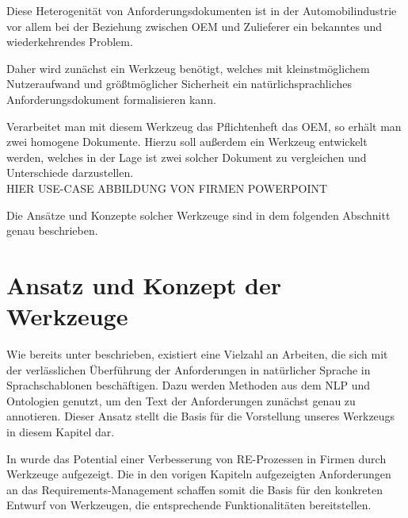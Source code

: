 \documentclass[12pt]{report}
\begin{document}
Diese Heterogenität von Anforderungsdokumenten ist in der Automobilindustrie vor allem bei der Beziehung zwischen OEM und Zulieferer ein bekanntes und wiederkehrendes Problem.

Daher wird zunächst ein Werkzeug benötigt, welches mit kleinstmöglichem Nutzeraufwand und größtmöglicher Sicherheit ein natürlichsprachliches Anforderungsdokument formalisieren kann. 

Verarbeitet man mit diesem Werkzeug das Pflichtenheft das OEM, so erhält man zwei homogene Dokumente. Hierzu soll außerdem ein Werkzeug entwickelt werden, welches in der Lage ist zwei solcher Dokument zu vergleichen und Unterschiede darzustellen.
\\ 
\newline
HIER USE-CASE ABBILDUNG VON FIRMEN POWERPOINT 
\\
\newline

Die Ansätze und Konzepte solcher Werkzeuge sind in dem folgenden Abschnitt genau beschrieben.

\section[Ansatz und Konzept]{Ansatz und Konzept der Werkzeuge}
Wie bereits unter beschrieben, existiert eine Vielzahl an Arbeiten, die sich mit der verlässlichen Überführung der Anforderungen in natürlicher Sprache in Sprachschablonen beschäftigen. Dazu werden Methoden aus dem NLP und Ontologien genutzt, um den Text der Anforderungen zunächst genau zu annotieren. Dieser Ansatz stellt die Basis für die Vorstellung unseres Werkzeugs in diesem Kapitel dar.

In \cite{zh17} wurde das Potential einer Verbesserung von RE-Prozessen in Firmen durch Werkzeuge aufgezeigt. Die in den vorigen Kapiteln aufgezeigten Anforderungen an das Requirements-Management schaffen somit die Basis für den konkreten Entwurf von Werkzeugen, die entsprechende Funktionalitäten bereitstellen.
\end{document}
